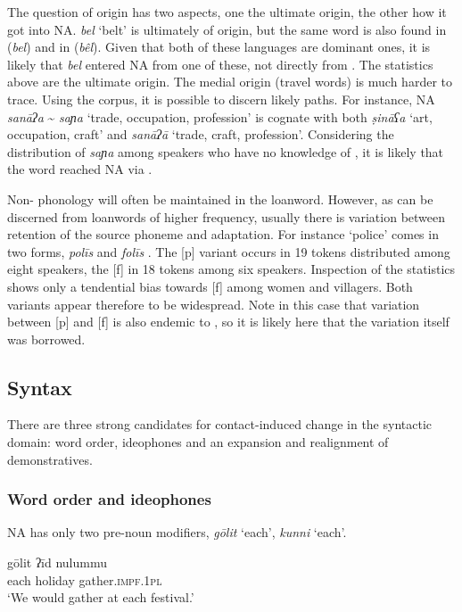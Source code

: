 \documentclass[output=paper]{langsci/langscibook}
\begin{document}
The question of origin has two aspects, one the ultimate origin, the other how it got into NA. \textit{bel} ‘belt’ is ultimately of  origin, but the same word is also found in  (\textit{bel}) and in  (\textit{bêl}). Given that both of these languages are dominant ones, it is likely that \textit{bel} entered NA from one of these, not directly from . The statistics above are the ultimate origin. The medial origin (travel words) is much harder to trace. Using the corpus, it is possible to discern likely paths. For instance, NA \textit{sanāʔa} {\textasciitilde} \textit{saɲa} ‘trade, occupation, profession’ is {cognate} with both   \textit{ṣināʕa} ‘art, occupation, craft’ and  \textit{sanāʔā} `trade, craft, profession'. Considering the distribution of \textit{saɲa} among speakers who have no knowledge of  , it is likely that the word reached NA via .

Non- phonology will often be maintained in the {loanword}. However, as can be discerned from {loanwords} of higher {frequency}, usually there is variation between retention of the source {phoneme} and adaptation. For instance ‘police’ comes in two forms, \textit{polīs} and \textit{folīs} \citep[278]{Owens2000article}. The [p] variant occurs in 19 tokens distributed among eight speakers, the [f] in 18 tokens among six speakers. Inspection of the statistics shows only a tendential bias towards [f] among women and villagers. Both variants appear therefore to be widespread. Note in this case that variation between [p] and [f] is also endemic to , so it is likely here that the variation itself was borrowed.

\subsection{Syntax}

There are three strong candidates for contact-induced change in the syntactic domain: {word order}, {ideophones} and an expansion and realignment of {demonstratives}.

\subsubsection{Word order and ideophones}

NA has only two pre-noun modifiers, \textit{gōlit} ‘each’, \textit{kunni} ‘each’.

\ea \gll gōlit ʔīd nulummu\\
     each holiday gather\textsc{.impf.1pl}\\
\glt ‘We would gather at each festival.’
\z
\end{document}
